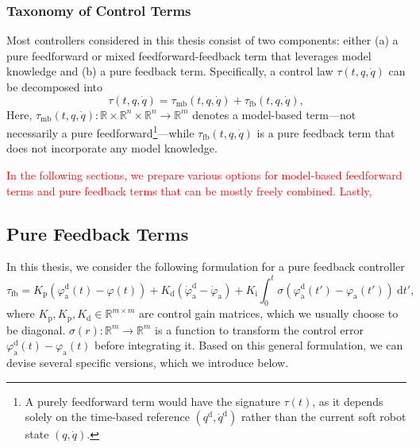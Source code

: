 \subsubsection{Taxonomy of Control Terms}
Most controllers considered in this thesis consist of two components: either (a) a pure feedforward or mixed feedforward-feedback term that leverages model knowledge and (b) a pure feedback term. Specifically, a control law $\tau(t, q, \dot{q})$ can be decomposed into
\begin{equation}
    \tau(t, q, \dot{q}) = \tau_\mathrm{mb}(t, q, \dot{q}) + \tau_\mathrm{fb}(t, q, \dot{q}),
\end{equation}
Here, $\tau_\mathrm{mb}(t, q, \dot{q}): \mathbb{R} \times \mathbb{R}^n \times \mathbb{R}^n \to \mathbb{R}^m$ denotes a model-based term—not necessarily a pure feedforward\footnote{A purely feedforward term would have the signature $\tau(t)$, as it depends solely on the time-based reference $(q^\mathrm{d},\dot{q}^\mathrm{d})$ rather than the current soft robot state $(q,\dot{q})$.}—while $\tau_\mathrm{fb}(t, q, \dot{q})$ is a pure feedback term that does not incorporate any model knowledge.

\textcolor{red}{In the following sections, we prepare various options for model-based feedforward terms and pure feedback terms that can be mostly freely combined. Lastly, }

\subsection{Pure Feedback Terms}\label{sub:background:model_based_control:feedback_terms}
In this thesis, we consider the following formulation for a pure feedback controller
\begin{equation}
    \tau_\mathrm{fb} = K_\mathrm{p} \left (\varphi_\mathrm{a}^\mathrm{d}(t) - \varphi(t) \right ) + K_\mathrm{d} \left ( \dot{\varphi}_\mathrm{a}^\mathrm{d} - \dot{\varphi}_\mathrm{a} \right ) + K_\mathrm{i} \int_0^t \sigma \left ( \varphi_{\mathrm{a}}^\mathrm{d}(t')-\varphi_{\mathrm{a}}(t') \right ) \: \mathrm{d} t',
\end{equation}
where $K_\mathrm{p}, K_\mathrm{p}, K_\mathrm{d} \in \mathbb{R}^{m \times m}$ are control gain matrices, which we usually choose to be diagonal. $\sigma(r): \mathbb{R}^m \to \mathbb{R}^m$ is a function to transform the control error $\varphi_{\mathrm{a}}^\mathrm{d}(t)-\varphi_{\mathrm{a}}(t)$ before integrating it.
Based on this general formulation, we can devise several specific versions, which we introduce below.

